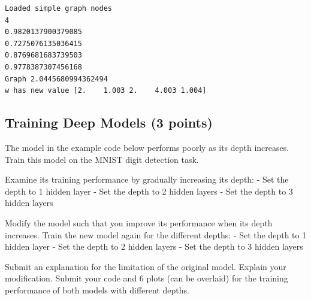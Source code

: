 \documentclass[11pt]{article}
\begin{document}
    \begin{Verbatim}[commandchars=\\\{\}]
Loaded simple graph nodes
4
0.9820137900379085
0.7275076135036415
0.8769681683739503
0.9778387307456168
Graph 2.0445680994362494
w has new value [2.    1.003 2.    4.003 1.004]

    \end{Verbatim}

    \hypertarget{training-deep-models-3-points}{%
\subsection{Training Deep Models (3
points)}\label{training-deep-models-3-points}}

The model in the example code below performs poorly as its depth
increases. Train this model on the MNIST digit detection task.

Examine its training performance by gradually increasing its depth: -
Set the depth to 1 hidden layer - Set the depth to 2 hidden layers - Set
the depth to 3 hidden layers

Modify the model such that you improve its performance when its depth
increases. Train the new model again for the different depths: - Set the
depth to 1 hidden layer - Set the depth to 2 hidden layers - Set the
depth to 3 hidden layers

Submit an explanation for the limitation of the original model. Explain
your modification. Submit your code and 6 plots (can be overlaid) for
the training performance of both models with different depths.
\end{document}
